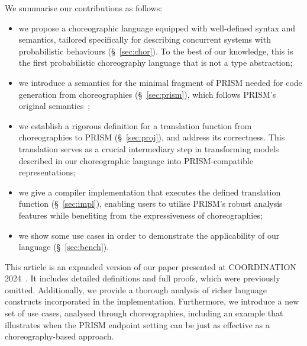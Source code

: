  We summarise our contributions as
follows:
\begin{itemize} 
\item we propose a choreographic language equipped with well-defined
  syntax and semantics, tailored specifically for describing
  concurrent systems with probabilistic behaviours
  (\S~\ref{sec:chor}). To the best of our knowledge, this is the first
  probabilistic choreography language that is not a type abstraction;

\item we introduce a semantics for the minimal fragment of PRISM
  needed for code generation from choreographies (\S~\ref{sec:prism}),
  which follows PRISM's original semantics~\cite{PRISMdoc};

\item we establish a rigorous definition for a translation function
  from choreographies to PRISM (\S~\ref{sec:proj}), and address its
  correctness. This translation serves as a crucial intermediary step
  in transforming models described in our choreographic language into
  PRISM-compatible representations;

\item we give a compiler implementation that executes the defined
  translation function (\S~\ref{sec:impl}),
  enabling users to utilise PRISM's robust analysis features while
  benefiting from the expressiveness of choreographies;

\item we show some use cases in order to demonstrate the applicability
  of our language (\S~\ref{sec:bench}).
\end{itemize}

%
This article is an expanded version of our paper presented at
COORDINATION 2024~\cite{CV24}. It includes detailed definitions and
full proofs, which were previously omitted. Additionally, we provide a
thorough analysis of richer language constructs incorporated in the
implementation. Furthermore, we introduce a new set of use cases,
analysed through choreographies, including an example that illustrates
when the PRISM endpoint setting can be just as effective as a
choreography-based approach.


